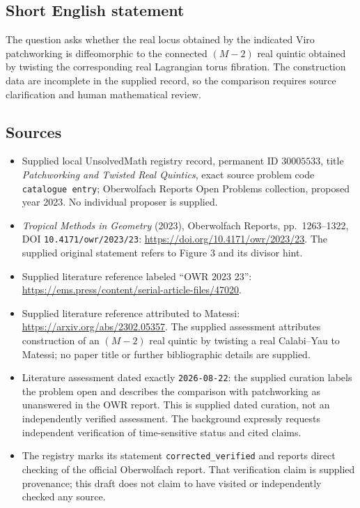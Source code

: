 \documentclass[11pt]{article}
\begin{document}
\subsection{Short English statement}
The question asks whether the real locus obtained by the indicated Viro patchworking is diffeomorphic to the connected \((M-2)\) real quintic obtained by twisting the corresponding real Lagrangian torus fibration. The construction data are incomplete in the supplied record, so the comparison requires source clarification and human mathematical review.
\subsection{Sources}
\begin{itemize}
\item Supplied local UnsolvedMath registry record, permanent ID \(30005533\), title \emph{Patchworking and Twisted Real Quintics}, exact source problem code \texttt{catalogue entry}; Oberwolfach Reports Open Problems collection, proposed year 2023. No individual proposer is supplied.
\item \emph{Tropical Methods in Geometry} (2023), Oberwolfach Reports, pp.\ 1263--1322, DOI \texttt{10.4171/owr/2023/23}: \url{https://doi.org/10.4171/owr/2023/23}. The supplied original statement refers to Figure 3 and its divisor hint.
\item Supplied literature reference labeled ``OWR 2023 23'': \url{https://ems.press/content/serial-article-files/47020}.
\item Supplied literature reference attributed to Matessi: \url{https://arxiv.org/abs/2302.05357}. The supplied assessment attributes construction of an \((M-2)\) real quintic by twisting a real Calabi--Yau to Matessi; no paper title or further bibliographic details are supplied.
\item Literature assessment dated exactly \texttt{2026-08-22}: the supplied curation labels the problem open and describes the comparison with patchworking as unanswered in the OWR report. This is supplied dated curation, not an independently verified assessment. The background expressly requests independent verification of time-sensitive status and cited claims.
\item The registry marks its statement \texttt{corrected\_verified} and reports direct checking of the official Oberwolfach report. That verification claim is supplied provenance; this draft does not claim to have visited or independently checked any source.
\end{itemize}
\end{document}
